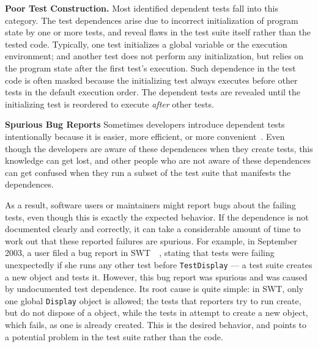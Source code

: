 \noindent \textbf{Poor Test Construction.} Most identified
dependent tests fall into this category. The test dependences
arise due to incorrect initialization of program state by one
or more tests, and reveal flaws in the test suite itself
rather than the tested code. Typically, one test initializes
a global variable or the execution environment; and another
test does not perform any initialization, but
relies on the program state after the first test's execution.
Such dependence in the test code is often masked because
the initializing test always executes before other tests in the
default execution order. The dependent tests are revealed
until the initializing test is reordered to execute
\textit{after} other tests. 


\vspace{1mm}

\noindent \textbf{Spurious Bug Reports}
Sometimes developers introduce dependent tests intentionally because it is
easier, more efficient, or more convenient~\cite{kapfhammeretal:FSE:2003, whittakeretal:2012}.
Even though the developers are aware of these dependences
when they create tests, this knowledge can get lost, 
and other people who are not aware of these dependences can get confused 
when they run a subset of the test suite that manifests the
dependences.

As a result, software users or maintainers
might report bugs about the failing tests, even though this
is exactly the expected behavior. 
If the dependence is not documented clearly and
correctly, it can take a considerable amount of time to work out that
these reported failures are spurious.
For example,
in September 2003, a user filed a
bug report in SWT~\cite{swt}~\cite{eclipsebug},
stating that tests were failing unexpectedly
if she runs any other test before \texttt{TestDisplay} --- 
a test suite creates a new  object and tests it.
However, this bug report was spurious and was
caused by undocumented test dependence.
Its root cause is quite simple: in SWT, only one global \texttt{Display}
object is allowed; the tests that reporters try to run
create, but do not dispose of a  object, while
the tests in  attempt to create
a new  object, which fails, as one
is already created. This is the desired behavior,
and points to a potential problem in the test suite rather
than the code.

